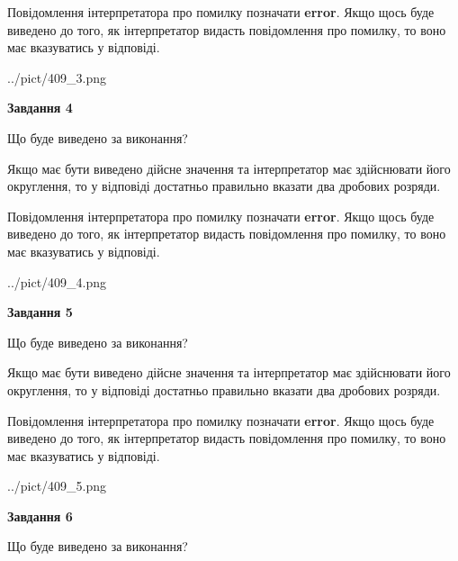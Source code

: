 \documentclass[12pt, ukrainian]{article}
\begin{document}
{\begin {Large}
Повідомлення інтерпретатора про помилку позначати \textbf{error}.
Якщо щось буде виведено до того, як інтерпретатор видасть повідомлення про помилку, 
то воно має вказуватись у відповіді. \par

\begin{center}
	{../pict/409_3.png}
\end{center}
\newpage

{\begin {center}\textbf{Завдання 4}\end {center}}\par
Що буде виведено за виконання? \par

Якщо має бути виведено дійсне значення та інтерпретатор має здійснювати його округлення, 
то у відповіді достатньо правильно вказати два дробових розряди.

Повідомлення інтерпретатора про помилку позначати \textbf{error}.
Якщо щось буде виведено до того, як інтерпретатор видасть повідомлення про помилку, 
то воно має вказуватись у відповіді. \par

\begin{center}
	{../pict/409_4.png}
\end{center}
\newpage

{\begin {center}\textbf{Завдання 5}\end {center}}\par
Що буде виведено за виконання? \par

Якщо має бути виведено дійсне значення та інтерпретатор має здійснювати його округлення, 
то у відповіді достатньо правильно вказати два дробових розряди.

Повідомлення інтерпретатора про помилку позначати \textbf{error}.
Якщо щось буде виведено до того, як інтерпретатор видасть повідомлення про помилку, 
то воно має вказуватись у відповіді. \par

\begin{center}
	{../pict/409_5.png}
\end{center}
\newpage

{\begin {center}\textbf{Завдання 6}\end {center}}\par
Що буде виведено за виконання? \par


\end{Large}}
\end{document}
